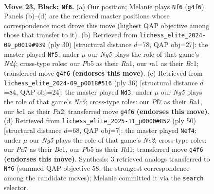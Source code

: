 \documentclass[11pt]{article}
\begin{document}
\clearpage

\begin{figure}[p]\centering
\begin{subfigure}{0.46\textwidth}\centering
\resizebox{\linewidth}{!}{%
\newchessgame
\chessboard[
  setfen={2r1b1k1/p1r2pp1/n3p3/1p5p/3P1Pn1/1P4PP/1N2P3/R1B1RBK1 b - - 0 23},
  showmover=false,
  pgfstyle=straightmove, color=movearrow, markmove={g4-f6}
]}
\caption{}
\end{subfigure}\hfill
\begin{subfigure}{0.46\textwidth}\centering
\resizebox{\linewidth}{!}{%
\newchessgame
\chessboard[
  setfen={r6r/pp1kbppp/6b1/2p1P3/3NP3/2P5/PP4PP/R1B2RK1 w - - 0 16},
  showmover=false,
  pgfstyle=straightmove, color=movearrow, markmove={d4-f5}
]}
\caption{}
\end{subfigure}
\\[4pt]
\begin{subfigure}{0.46\textwidth}\centering
\resizebox{\linewidth}{!}{%
\newchessgame
\chessboard[
  setfen={r1b1r1k1/p4pbp/1pp3p1/2N5/2PpP3/1P4P1/P4PBP/R2R2K1 w - - 0 19},
  showmover=false,
  pgfstyle=straightmove, color=movearrow, markmove={c5-d3}
]}
\caption{}
\end{subfigure}\hfill
\begin{subfigure}{0.46\textwidth}\centering
\resizebox{\linewidth}{!}{%
\newchessgame
\chessboard[
  setfen={2k1r3/2p2rb1/p7/1bpN1p1p/p1n4P/2P2P2/1P2NKP1/2BR3R w - - 1 26},
  showmover=false,
  pgfstyle=straightmove, color=movearrow, markmove={e2-f4}
]}
\caption{}
\end{subfigure}
\caption{\textbf{Move 23, Black: \texttt{Nf6}.} (a) Our position; Melanie plays \texttt{Nf6} (\texttt{g4f6}). Panels (b)--(d) are the retrieved master positions whose correspondence most drove this move (highest QAP objective among those that transfer to it). (b) Retrieved from \texttt{lichess\_elite\_2024-09\_p0019\#939} (ply 30) [structural distance $d$=78, QAP obj=27]: the master played \texttt{Nf5}; under $\mu$ our \emph{Ng5} plays the role of that game's \emph{Nd4}; cross-type roles: our \emph{P}b5 as their \emph{R}a1, our \emph{r}a1 as their \emph{B}c1; transferred move \texttt{g4f6} \textbf{(endorses this move)}. (c) Retrieved from \texttt{lichess\_elite\_2024-09\_p0018\#516} (ply 36) [structural distance $d$=84, QAP obj=24]: the master played \texttt{Nd3}; under $\mu$ our \emph{Ng5} plays the role of that game's \emph{Nc5}; cross-type roles: our \emph{P}f7 as their \emph{R}a1, our \emph{b}c1 as their \emph{P}a2; transferred move \texttt{g4f6} \textbf{(endorses this move)}. (d) Retrieved from \texttt{lichess\_elite\_2025-11\_p0000\#852} (ply 50) [structural distance $d$=68, QAP obj=7]: the master played \texttt{Nef4}; under $\mu$ our \emph{Ng5} plays the role of that game's \emph{Ne2}; cross-type roles: our \emph{P}a7 as their \emph{B}c1, our \emph{P}b5 as their \emph{R}d1; transferred move \texttt{g4f6} \textbf{(endorses this move)}. Synthesis: 3 retrieved analogs transferred to \texttt{Nf6} (summed QAP objective 58, the strongest correspondence among the candidate moves); Melanie committed it via the \texttt{search} selector.}
\label{fig:thought-m45}
\end{figure}
\end{document}
